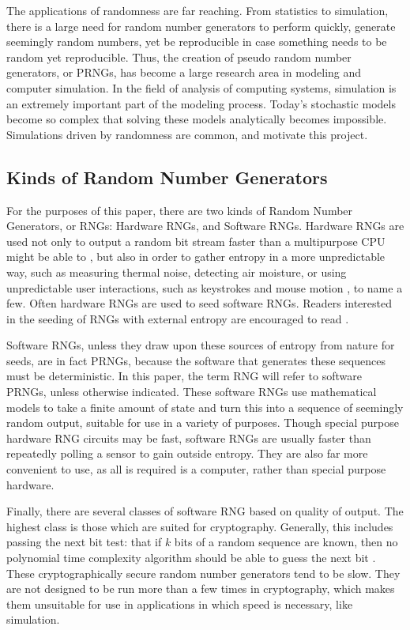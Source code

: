 The applications of randomness are far reaching. From statistics to simulation, there is a large need for random number generators to perform quickly, generate seemingly random numbers, yet be reproducible in case something needs to be random yet reproducible. Thus, the creation of pseudo random number generators, or PRNGs, has become a large research area in modeling and computer simulation. In the field of analysis of computing systems, simulation is an extremely important part of the modeling process. Today's stochastic models become so complex that solving these models analytically becomes impossible. Simulations driven by randomness are common, and motivate this project.

\subsection{Kinds of Random Number Generators}
For the purposes of this paper, there are two kinds of Random Number Generators, or RNGs: Hardware RNGs, and Software RNGs. Hardware RNGs are used not only to output a random bit stream faster than a multipurpose CPU might be able to \cite{Saiprasert:2010:OHA:1857927.1857929,Barel:1983:FHR:800042.801454}, but also in order to gather entropy in a more unpredictable way, such as measuring thermal noise, detecting air moisture, or using unpredictable user interactions, such as keystrokes and mouse motion , to name a few. Often hardware RNGs are used to seed software RNGs. Readers interested in the seeding of RNGs with external entropy are encouraged to read \cite{Hennebert:2013:EHP:2462096.2462122}.

Software RNGs, unless they draw upon these sources of entropy from nature for seeds, are in fact PRNGs, because the software that generates these sequences must be deterministic. In this paper, the term RNG will refer to software PRNGs, unless otherwise indicated. These software RNGs use mathematical models to take a finite amount of state and turn this into a sequence of seemingly random output, suitable for use in a variety of purposes. Though special purpose hardware RNG circuits may be fast, software RNGs are usually faster than repeatedly polling a sensor to gain outside entropy. They are also far more convenient to use, as all is required is a computer, rather than special purpose hardware.

Finally, there are several classes of software RNG based on quality of output. The highest class is those which are suited for cryptography. Generally, this includes passing the next bit test: that if $k$ bits of a random sequence are known, then no polynomial time complexity algorithm should be able to guess the next bit \cite{Yao_1982}. These cryptographically secure random number generators tend to be slow. They are not designed to be run more than a few times in cryptography, which makes them unsuitable for use in applications in which speed is necessary, like simulation.

